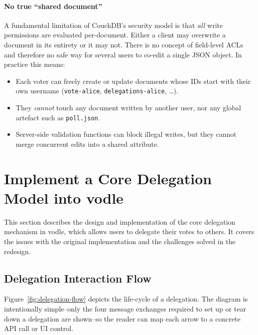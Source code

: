 \paragraph{No true ``shared document''}

A fundamental limitation of CouchDB's security model is that \emph{all} write permissions are evaluated per-document.  Either a client may overwrite a document in its entirety or it may not.  There is no concept of field-level ACLs and therefore no safe way for several users to co-edit a single JSON object.  In practice this means:

\begin{itemize}
  \item Each voter can freely create or update documents whose IDs start with their own username (\verb|vote-alice|, \verb|delegations-alice|, \dots).
  \item They \emph{cannot} touch any document written by another user, nor any global artefact such as \verb|poll.json|.
  \item Server-side validation functions can block illegal writes, but they cannot merge concurrent edits into a shared attribute.
\end{itemize}

\section{Implement a Core Delegation Model into vodle}
\label{sec:core_delegation_detailed}
This section describes the design and implementation of the core delegation mechanism in vodle, which allows users to delegate their votes to others. It covers the issues with the original implementation and the challenges solved in the redesign.

\subsection{Delegation Interaction Flow}
Figure~\ref{fig:delegation-flow} depicts the life-cycle of a delegation. The diagram is intentionally simple--only the four message exchanges required to set up or tear down a delegation are shown--so the reader can map each arrow to a concrete API call or UI control.


